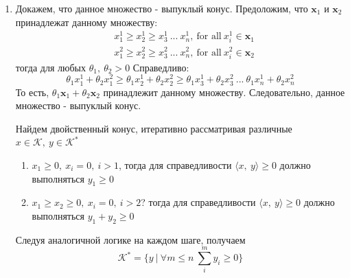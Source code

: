 \documentclass{article}
\DeclareMathOperator{\tr}{tr}
\begin{document}
\begin{enumerate}
          Докажем, что этот конус является двойственным для самого себя. Возьмем произвольную матрицу $Y, \ Y \succ 0$, тогда по предположению
          \[
              \tr(X^\top Y) > 0
          \]
          Так как $X \succ 0$, справедливо
          \[
              X = Q^T \Lambda Q = \sum_{i}{\lambda_i q_i q_i^\top}, \ \lambda_i >= 0
          \]
          Тогда
          \[
              \tr(X^\top Y) = \tr(Y \sum_{i}{\lambda_i q_i q_i^\top}) = \sum_{i}{\lambda_i q_i^\top Y q_i} \geq 0
          \]
          По положительной полуопределенности $Y$.
          Мы доказали, что $S_{+}^{n \times n} \subseteq \mathcal{K}^{*}$. Теперь докажем $S_{+}^{n \times n} = \mathcal{K}^{*}$:
          Допустим, что существует $Y$ такое, что $Y \in \mathcal{K}^*, \ Y \notin S_{+}^{n \times n}$. Тогда $\exists i, \ \lambda_i < 0$ в спектральном разложении $Y$. Тогда возьмем $X = q_i q_i^\top$. Скалярное произведение будет равно
          \[
              \tr(X^\top Y) = \tr(q_i q_i^\top Y) = \lambda_i < 0
          \]
          Пришли к противоречию, следовательно,
          \[
              \mathcal{K}^{*} = S^{n \times n}_{+}
          \]
    \item
          Докажем, что данное множество - выпуклый конус. Предоложим, что $\textbf{x}_1$ и $\textbf{x}_2$ принадлежат данному множеству:
          \begin{align*}
               & x_1^1 \geq x_2^1 \geq x_3^1 \ ... \ x_n^1, \ \text{for all} \ x_i^1 \in \textbf{x}_1 \\
               & x_1^2 \geq x_2^2 \geq x_3^2 \ ... \ x_n^2, \ \text{for all} \ x_i^2 \in \textbf{x}_2
          \end{align*}
          тогда для любых $\theta_1, \ \theta_2 > 0$ Справедливо:
          \[
              \theta_1 x_1^1 + \theta_2 x_1^2 \geq \theta_1 x_2^1 + \theta_2 x_2^2 \geq \theta_1 x_3^1 + \theta_2 x_3^2 \ ... \ \theta_1 x_n^1 + \theta_2 x_n^2
          \]
          То есть, $\theta_1 \textbf{x}_1 + \theta_2 \textbf{x}_2$ принадлежит данному множеству. Следовательно, данное множество - выпуклый конус.

          Найдем двойственный конус, итеративно рассматривая различные $x \in \mathcal{K}, \ y \in \mathcal{K}^*$
          \begin{enumerate}
              \item $x_1 \geq 0, \ x_i = 0, \ i > 1$,
                    тогда для справедливости $\langle x, \ y\rangle \geq 0$ должно выполняться $y_1 \geq 0$
              \item $x_1 \geq x_2 \geq 0, \ x_i = 0, \ i > 2$?
                    тогда для справедливости $\langle x, \ y\rangle \geq 0$ должно выполняться $y_1 + y_2 \geq 0$
          \end{enumerate}
          Следуя аналогичной логике на каждом шаге, получаем
          \[
              \mathcal{K}^* = \{y \ | \ \forall m \leq n \ \sum_i^m{y_i} \geq 0\}
          \]


\end{enumerate}
\end{document}
